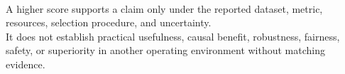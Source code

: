 \begin{warning} \label{warn:ml-benchmark-overclaiming} \\
A higher score supports a claim only under the reported dataset, metric, resources, selection procedure, and uncertainty.\\
It does not establish practical usefulness, causal benefit, robustness, fairness, safety, or superiority in another operating environment without matching evidence.
\end{warning}
